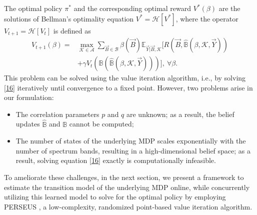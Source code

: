 \documentclass[10pt,twocolumn]{IEEEtran}
\begin{document}
The optimal policy $\pi^*$ and the corresponding optimal reward $V^*(\beta)$ are the solutions of Bellman's optimality equation $V^*{=}\mathcal{H}[V^*]$, where the operator $V_{t+1}{=}\mathcal {H}[V_{t}]$ is defined as
\begin{align}\label{16}
\nonumber
        V_{t+1}(\beta) = &\max_{\mathcal{K} {\in} \mathcal{A}} \sum_{\vec{B} {\in} \mathcal{B}} \beta(\vec{B}) \mathbb{E}_{\vec{Y}|\vec{B}, \mathcal{K}} \Big[R(\vec{B}, \hat{\mathbb{B}}(\beta, \mathcal{K}, \vec{Y}))\\ &+\gamma V_{t}(\mathbb{B}(\hat{\mathbb{B}}(\beta, \mathcal{K}, \vec{Y})))\Big],\ \forall \beta.
\end{align}
This problem can be solved using the value iteration algorithm, i.e., by solving \eqref{16} iteratively until convergence to a fixed point. However, two problems arise in our formulation:
\begin{itemize}
\item The correlation parameters $p$ and $q$ are unknown; as a result, the belief updates 
$\hat{\mathbb B}$ and $\mathbb B$ cannot be computed;
\item The number of states of the underlying MDP scales exponentially with the number of spectrum bands, resulting in a high-dimensional belief space; as a result, solving equation \eqref{16} exactly is computationally infeasible.
\end{itemize}
To ameliorate these challenges, in the next section, we present a framework to estimate the transition model of the underlying MDP online, while concurrently utilizing this learned model to solve for the optimal policy by employing PERSEUS \cite{DBLP:journals/corr/abs-1109-2145}, a low-complexity, randomized point-based value iteration algorithm.
\vspace{-4mm}
\end{document}
